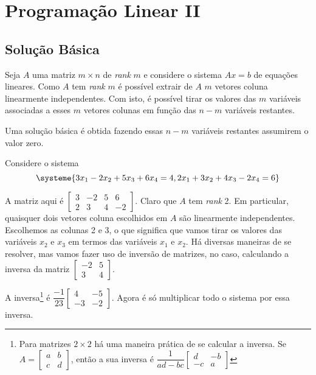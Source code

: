 
\chapter{Programação Linear II}

\section{Solução Básica} %

Seja $ A $ uma matriz $ m \times n $ de \textit{rank} $ m $ e considere o 
sistema $ Ax = b $ de equações lineares.
Como $ A $ tem \textit{rank} $ m $ é possível extrair de $ A $ $ m $ vetores
coluna linearmente independentes.
Com isto, é possível tirar os valores das $ m $ variáveis associadas a esses
$ m $ vetores colunas em função das $ n - m $ variáveis restantes.

Uma solução básica é obtida fazendo essas $ n - m $ variáveis restantes 
assumirem o valor zero.

\begin{exemplo}
  Considere o sistema 
  \[
   \systeme{3x_1-2x_2+5x_3+6x_4 = 4, 2x_1+3x_2+4x_3-2x_4=6}
  \]
\end{exemplo}

A matriz aqui é 
$
  \begin{bmatrix} 
   3 & -2 & 5 & 6 \\ 
   2 &  3 & 4 & -2
  \end{bmatrix}
$.
Claro que $ A $ tem \textit{rank} 2.
Em particular, quaisquer dois vetores coluna escolhidos em $ A $ são linearmente
independentes.
Escolhemos as colunas 2 e 3, o que significa que vamos tirar os valores das 
variáveis $ x_2 $ e $ x_3 $ em termos das variáveis $ x_1 $ e $ x_2 $.
Há diversas maneiras de se resolver, mas vamos fazer uso de inversão de matrizes,
no caso, calculando a inversa da matriz $\begin{bmatrix} -2 & 5 \\ 3 & 4\end{bmatrix}$.

A inversa\footnote{Para matrizes $ 2 \times 2 $ há uma maneira prática de se 
calcular a inversa. 
Se $ A = \begin{bmatrix} a & b \\ c & d\end{bmatrix} $, então a sua inversa é
$ \dfrac{1}{ad - bc}\begin{bmatrix} d & -b \\ -c & a\end{bmatrix} $
} é 
$
  \dfrac{-1}{23}
  \begin{bmatrix} 
    4 & -5 \\ 
   -3 & -2
  \end{bmatrix}
$.
Agora é só multiplicar todo o sistema por essa inversa.

